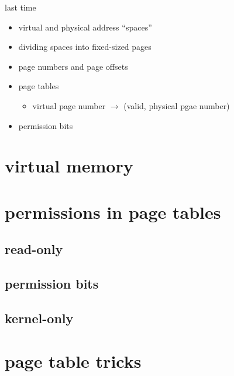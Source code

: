 \date{}
\title{}
\date{}

\begin{frame}
    \titlepage
\end{frame}
\usetikzlibrary{fit}



\begin{frame}{last time}
    \begin{itemize}
    \item virtual and physical address ``spaces''
    \item dividing spaces into fixed-sized pages
    \item page numbers and page offsets
    \item page tables
        \begin{itemize}
        \item virtual page number $\rightarrow$ (valid, physical pgae number)
        \end{itemize}
    \item permission bits
    \end{itemize}
\end{frame}


\section{virtual memory}

\section{permissions in page tables}
\subsection{read-only}

\subsection{permission bits}


\subsection{kernel-only}


\section{page table tricks}
